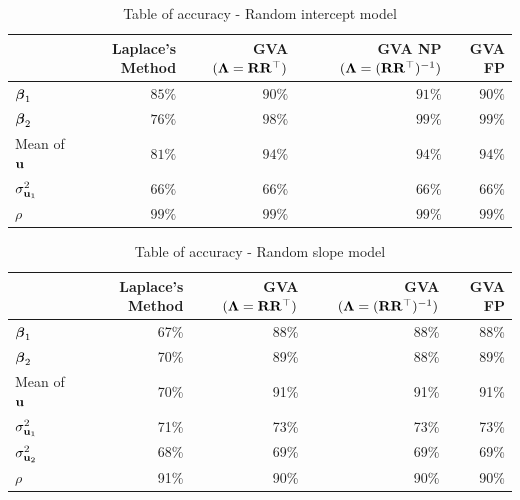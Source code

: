 			\begin{table}
				\caption{Table of accuracy - Random intercept model}
				\label{tab:accuracy_int}
				\begin{tabular}{|l|rrrr|}
					\hline
					                   & Laplace's Method & GVA $({\boldsymbol \Lambda} = {\bf R} {\bf R}^\top)$ & GVA NP $({\boldsymbol \Lambda} = ({\bf R} {\bf R}^\top)^{-1})$ & GVA FP \\
					\hline
					${\boldsymbol \beta}_1$         & $85\%$           & $90\%$                          & $91\%$                                    & $90\%$ \\ 
					${\boldsymbol \beta}_2$         & $76\%$           & $98\%$                          & $99\%$                                    & $99\%$ \\ 
					Mean of ${\bf u}$      & $81\%$           & $94\%$                          & $94\%$                                    & $94\%$ \\
					$\sigma^2_{{\bf u}_1}$ & $66\%$           & $66\%$                          & $66\%$                                    & $66\%$ \\ 
					$\rho$             & $99\%$           & $99\%$                          & $99\%$                                    & $99\%$ \\ 
					\hline
				\end{tabular}
			\end{table}
					
			\begin{table}
				\caption{Table of accuracy - Random slope model}
				\label{tab:accuracy_slope}
				\begin{tabular}{|l|rrrr|}
					\hline
					                   & Laplace's Method & GVA $({\boldsymbol \Lambda} = {\bf R} {\bf R}^\top)$ & GVA $({\boldsymbol \Lambda} = ({\bf R} {\bf R}^\top)^{-1})$ & GVA FP \\
					\hline
					${\boldsymbol \beta}_1$         & 67\%             & 88\%                            & 88\%                                   & 88\%   \\
					${\boldsymbol \beta}_2$         & 70\%             & 89\%                            & 88\%                                   & 89\%   \\
					Mean of ${\bf u}$      & 70\%             & 91\%                            & 91\%                                   & 91\%   \\
					$\sigma^2_{{\bf u}_1}$ & 71\%             & 73\%                            & 73\%                                   & 73\%   \\
					$\sigma^2_{{\bf u}_2}$ & 68\%             & 69\%                            & 69\%                                   & 69\%   \\
					$\rho$             & 91\%             & 90\%                            & 90\%                                   & 90\%   \\
					\hline
				\end{tabular}
			\end{table}
					
